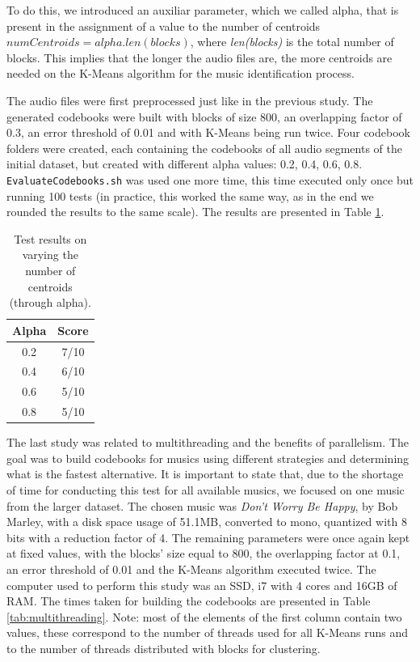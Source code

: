 \documentclass[12pt]{article}
\begin{document}
To do this, we introduced an auxiliar parameter, which we called alpha, that is 
present in the assignment of a value to the number of centroids 
$numCentroids = alpha . len(blocks)$, where {\it len(blocks)\/} is the total 
number of blocks.
This implies that the longer the audio files are, the more centroids are needed
on the K-Means algorithm for the music identification process.

The audio files were first preprocessed just like in the previous study.
The generated codebooks were built with blocks of size 800, an overlapping 
factor of 0.3, an error threshold of 0.01 and with K-Means being run twice.
Four codebook folders were created, each containing the codebooks of all audio
segments of the initial dataset, but created with different alpha values:
0.2, 0.4, 0.6, 0.8.
\texttt{EvaluateCodebooks.sh} was used one more time, this time executed only 
once but running 100 tests (in practice, this worked the same way, as in the end 
we rounded the results to the same scale).
The results are presented in Table \ref{tab:numcentroids}.

\begin{table}[H]
  \begin{center}
    \begin{tabular}{c|c}
      \textbf{Alpha} & \textbf{Score}\\
      \hline
      0.2 & 7/10\\
      0.4 & 6/10\\
      0.6 & 5/10\\
      0.8 & 5/10\\
    \end{tabular}
  \end{center}
  \caption{Test results on varying the number of centroids (through alpha).}
  \label{tab:numcentroids}
\end{table}

The last study was related to multithreading and the benefits of parallelism.
The goal was to build codebooks for musics using different strategies and
determining what is the fastest alternative.
It is important to state that, due to the shortage of time for conducting this 
test for all available musics, we focused on one music from the larger dataset.
The chosen music was {\it Don't Worry Be Happy\/}, by Bob Marley, with a disk 
space usage of 51.1MB, converted to mono, quantized with 8 bits with a reduction 
factor of 4.
The remaining parameters were once again kept at fixed values, with the blocks'
size equal to 800, the overlapping factor at 0.1, an error threshold of 0.01 and
the K-Means algorithm executed twice.
The computer used to perform this study was an SSD, i7 with 4 cores and 16GB of RAM.
The times taken for building the codebooks are presented in Table \ref{tab:multithreading}.
Note: most of the elements of the first column contain two values, these 
correspond to the number of threads used for all K-Means runs and to the number
of threads distributed with blocks for clustering.
\end{document}

